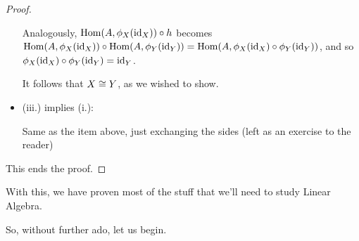 \begin{proof}
\begin{itemize}
		Analogously, $\mathrm{Hom}(A,\phi_X({\rm id}_X))\circ h$ becomes $\mathrm{Hom}(A,\phi_X({\rm id}_X))\circ \mathrm{Hom}(A,\phi_Y({\rm id}_Y))=\mathrm{Hom}(A,\phi_X({\rm id}_X)\circ\phi_Y({\rm id}_Y))$, and so $\phi_X({\rm id}_X)\circ\phi_Y({\rm id}_Y)={\rm id}_Y$.
		
		It follows that $X\cong Y$, as we wished to show.
		
		\item (iii.) implies (i.):
		
		Same as the item above, just exchanging the sides (left as an exercise to the reader)
	\end{itemize}

This ends the proof.
\end{proof}

With this, we have proven most of the stuff that we'll need to study Linear Algebra.

So, without further ado, let us begin.